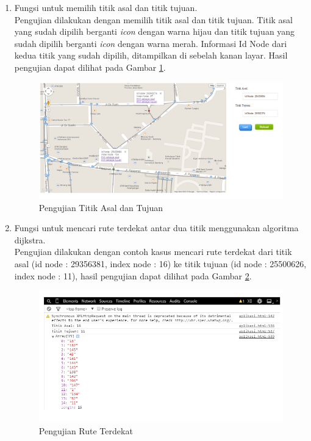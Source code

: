 \begin{enumerate}
  \item Fungsi untuk memilih titik asal dan titik tujuan.\\
  Pengujian dilakukan dengan memilih titik asal dan titik tujuan. Titik asal
  yang sudah dipilih berganti \textit{icon} dengan warna hijau dan titik tujuan
  yang sudah dipilih berganti \textit{icon} dengan warna merah. Informasi
  Id Node dari kedua titik yang sudah dipilih, ditampilkan di sebelah kanan
  layar. Hasil pengujian dapat dilihat pada Gambar \ref{fig:pu_titik}.
\begin{figure}[h]
\centering
\includegraphics[scale=0.45]{Gambar/pu_titik}
\caption[Pengujian Titik Asal dan Tujuan]{Pengujian Titik Asal dan Tujuan}
\label{fig:pu_titik}
\end{figure}
  
  \item Fungsi untuk mencari rute terdekat antar dua titik menggunakan
  algoritma dijkstra.\\
  Pengujian dilakukan dengan contoh kasus mencari rute terdekat dari titik asal
  (id node : 29356381, index node : 16) ke titik tujuan (id node : 25500626,
  index node : 11), hasil pengujian dapat dilihat pada Gambar \ref{fig:pu_rute}.
\begin{figure}[h]
\centering
\includegraphics[scale=0.8]{Gambar/pu_rute}
\caption[Pengujian Rute Terdekat]{Pengujian Rute Terdekat}
\label{fig:pu_rute}
\end{figure}


\end{enumerate}
